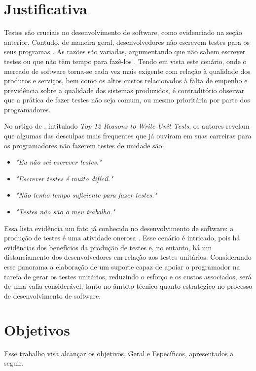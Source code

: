  \section{Justificativa}
  Testes são cruciais no desenvolvimento de software, como evidenciado na seção anterior. Contudo, de maneira geral, desenvolvedores não escrevem testes para os seus programas \cite{burkeCoyner2003}. As razões são variadas, argumentando que não sabem escrever testes ou que não têm tempo para fazê-los \cite{burkeCoyner2003}. Tendo em vista este cenário, onde o mercado de software torna-se cada vez mais exigente com relação à qualidade dos produtos e serviços, bem como os altos custos relacionados à falta de empenho e previdência sobre a qualidade dos sistemas produzidos, é contraditório observar que a prática de fazer testes não seja comum, ou mesmo prioritária por parte dos programadores.
  \par
  \indent No artigo de , intitulado \textit{Top 12 Reasons to Write Unit Tests}, os autores revelam que algumas das desculpas mais frequentes que já ouviram em suas carreiras para os programadores não fazerem testes de unidade são:
  \begin{itemize}
    \item \textit{"Eu não sei escrever testes."}
    \item \textit{"Escrever testes é muito difícil."}
    \item \textit{"Não tenho tempo suficiente para fazer testes."}
    \item \textit{"Testes não são o meu trabalho."}
  \end{itemize}
  \par
  \indent Essa lista evidência um fato já conhecido no desenvolvimento de software: a produção de testes é uma atividade onerosa \cite{barbosaEtAl2009}. Esse cenário é intricado, pois há evidências dos benefícios da produção de testes e, no entanto, há um distanciamento dos desenvolvedores em relação aos testes unitários. Considerando esse panorama a elaboração de um suporte capaz de apoiar o programador na tarefa de gerar os testes unitários, reduzindo o esforço e os custos associados, será de uma valia considerável, tanto no âmbito técnico quanto estratégico no processo de desenvolvimento de software.
 
  \section{Objetivos}
  Esse trabalho visa alcançar os objetivos, Geral e Específicos, apresentados a seguir.
